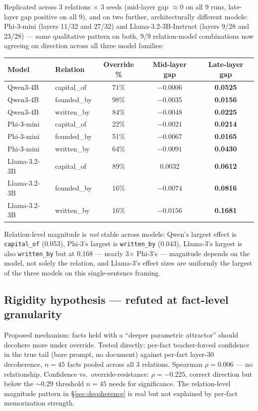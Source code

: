 \documentclass[11pt]{article}
\begin{document}
Replicated across 3 relations $\times$ 3 seeds (mid-layer gap $\approx 0$ on
all 9 runs, late-layer gap positive on all 9), and on two further,
architecturally different models: Phi-3-mini (layers 11/32 and 27/32) and
Llama-3.2-3B-Instruct (layers 9/28 and 23/28) --- same qualitative pattern on
both, 9/9 relation-model combinations now agreeing on direction across all
three model families:

\begin{table}[h]
\centering
\begin{tabular}{@{}llccc@{}}
\toprule
Model & Relation & Override \% & Mid-layer gap & Late-layer gap \\
\midrule
Qwen3-4B & capital\_of & 71\% & $-0.0006$ & \textbf{0.0525} \\
Qwen3-4B & founded\_by & 98\% & $-0.0035$ & \textbf{0.0156} \\
Qwen3-4B & written\_by & 84\% & $-0.0048$ & \textbf{0.0225} \\
Phi-3-mini & capital\_of & 22\% & $-0.0021$ & \textbf{0.0214} \\
Phi-3-mini & founded\_by & 51\% & $-0.0067$ & \textbf{0.0165} \\
Phi-3-mini & written\_by & 64\% & $-0.0091$ & \textbf{0.0430} \\
Llama-3.2-3B & capital\_of & 89\% & 0.0032 & \textbf{0.0612} \\
Llama-3.2-3B & founded\_by & 16\% & $-0.0074$ & \textbf{0.0816} \\
Llama-3.2-3B & written\_by & 16\% & $-0.0156$ & \textbf{0.1681} \\
\bottomrule
\end{tabular}
\end{table}

Relation-level magnitude is \emph{not} stable across models: Qwen's largest
effect is \texttt{capital\_of} (0.053), Phi-3's largest is \texttt{written\_by}
(0.043), Llama-3's largest is also \texttt{written\_by} but at 0.168 ---
nearly 3$\times$ Phi-3's --- magnitude depends on the model, not solely the
relation, and Llama-3's effect sizes are uniformly the largest of the three
models on this single-sentence framing.

\subsection{Rigidity hypothesis --- refuted at fact-level granularity}

Proposed mechanism: facts held with a ``deeper parametric attractor'' should
decohere more under override. Tested directly: per-fact teacher-forced
confidence in the true tail (bare prompt, no document) against per-fact
layer-30 decoherence, $n=45$ facts pooled across all 3 relations. Spearman
$\rho = 0.006$ --- no relationship. Confidence vs.\ override-resistance:
$\rho = -0.225$, correct direction but below the $\sim$0.29 threshold $n=45$
needs for significance. The relation-level magnitude pattern in
\S\ref{sec:decoherence} is real but not explained by per-fact memorization
strength.
\end{document}
